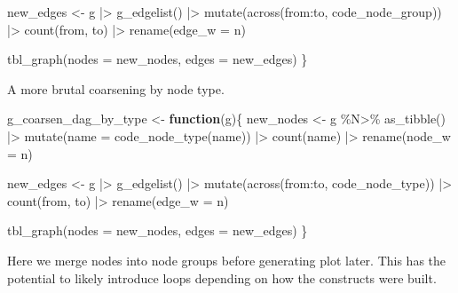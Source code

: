 \documentclass[
  letterpaper,
  DIV=11,
  numbers=noendperiod]{scrartcl}
\newenvironment{Shaded}{\begin{snugshade}}{\end{snugshade}}
\newcommand{\AttributeTok}[1]{\textcolor[rgb]{0.40,0.45,0.13}{#1}}
\newcommand{\ControlFlowTok}[1]{\textcolor[rgb]{0.00,0.23,0.31}{\textbf{#1}}}
\newcommand{\FunctionTok}[1]{\textcolor[rgb]{0.28,0.35,0.67}{#1}}
\newcommand{\NormalTok}[1]{\textcolor[rgb]{0.00,0.23,0.31}{#1}}
\newcommand{\OtherTok}[1]{\textcolor[rgb]{0.00,0.23,0.31}{#1}}
\newcommand{\SpecialCharTok}[1]{\textcolor[rgb]{0.37,0.37,0.37}{#1}}
\begin{document}
\begin{Shaded}
\begin{Highlighting}[]
\NormalTok{    new\_edges }\OtherTok{\textless{}{-}}\NormalTok{ g }\SpecialCharTok{|\textgreater{}} 
        \FunctionTok{g\_edgelist}\NormalTok{() }\SpecialCharTok{|\textgreater{}} 
    \FunctionTok{mutate}\NormalTok{(}\FunctionTok{across}\NormalTok{(from}\SpecialCharTok{:}\NormalTok{to, code\_node\_group)) }\SpecialCharTok{|\textgreater{}} 
    \FunctionTok{count}\NormalTok{(from, to) }\SpecialCharTok{|\textgreater{}} 
    \FunctionTok{rename}\NormalTok{(}\AttributeTok{edge\_w =}\NormalTok{ n)}
    
    \FunctionTok{tbl\_graph}\NormalTok{(}\AttributeTok{nodes =}\NormalTok{ new\_nodes, }\AttributeTok{edges =}\NormalTok{ new\_edges)}
\NormalTok{\}}
\end{Highlighting}
\end{Shaded}

A more brutal coarsening by node type.

\begin{Shaded}
\begin{Highlighting}[]
\NormalTok{g\_coarsen\_dag\_by\_type }\OtherTok{\textless{}{-}} \ControlFlowTok{function}\NormalTok{(g)\{}
\NormalTok{    new\_nodes }\OtherTok{\textless{}{-}}\NormalTok{ g }\SpecialCharTok{\%N\textgreater{}\%}
        \FunctionTok{as\_tibble}\NormalTok{() }\SpecialCharTok{|\textgreater{}} 
        \FunctionTok{mutate}\NormalTok{(}\AttributeTok{name =} \FunctionTok{code\_node\_type}\NormalTok{(name)) }\SpecialCharTok{|\textgreater{}} 
        \FunctionTok{count}\NormalTok{(name) }\SpecialCharTok{|\textgreater{}} 
        \FunctionTok{rename}\NormalTok{(}\AttributeTok{node\_w =}\NormalTok{ n)}
    
\NormalTok{    new\_edges }\OtherTok{\textless{}{-}}\NormalTok{ g }\SpecialCharTok{|\textgreater{}} 
        \FunctionTok{g\_edgelist}\NormalTok{() }\SpecialCharTok{|\textgreater{}} 
    \FunctionTok{mutate}\NormalTok{(}\FunctionTok{across}\NormalTok{(from}\SpecialCharTok{:}\NormalTok{to, code\_node\_type)) }\SpecialCharTok{|\textgreater{}} 
    \FunctionTok{count}\NormalTok{(from, to) }\SpecialCharTok{|\textgreater{}} 
    \FunctionTok{rename}\NormalTok{(}\AttributeTok{edge\_w =}\NormalTok{ n)}
    
    \FunctionTok{tbl\_graph}\NormalTok{(}\AttributeTok{nodes =}\NormalTok{ new\_nodes, }\AttributeTok{edges =}\NormalTok{ new\_edges)}
\NormalTok{\}}
\end{Highlighting}
\end{Shaded}

Here we merge nodes into node groups before generating plot later. This
has the potential to likely introduce loops depending on how the
constructs were built.
\end{document}
